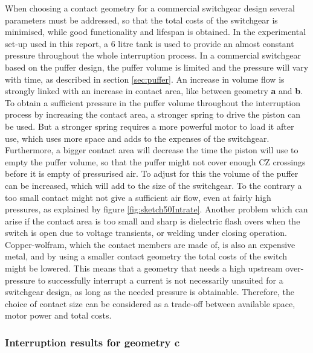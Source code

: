 \documentclass[10pt,b5paper,twoside]{article}
\begin{document}
When choosing a contact geometry for a commercial switchgear design several parameters must be addressed, so that the total costs of the switchgear is minimised, while good functionality and lifespan is obtained. In the experimental set-up used in this report, a 6 litre tank is used to provide an almost constant pressure throughout the whole interruption process. In a commercial switchgear based on the puffer design, the puffer volume is limited and the pressure will vary with time, as described in section \ref{sec:puffer}. An increase in volume flow is strongly linked with an increase in contact area, like between geometry \textbf{a} and \textbf{b}. To obtain a sufficient pressure in the puffer volume throughout the interruption process by increasing the contact area, a stronger spring to drive the piston can be used. But a stronger spring requires a more powerful motor to load it after use, which uses more space and adds to the expenses of the switchgear. Furthermore, a bigger contact area will decrease the time the piston will use to empty the puffer volume, so that the puffer might not cover enough CZ crossings before it is empty of pressurised air. To adjust for this the volume of the puffer can be increased, which will add to the size of the switchgear. To the contrary a too small contact might not give a sufficient air flow, even at fairly high pressures, as explained by figure \ref{fig:sketch50Intrate}. Another problem which can arise if the contact area is too small and sharp is dielectric flash overs when the switch is open due to voltage transients, or welding under closing operation. Copper-wolfram, which the contact members are made of, is also an expensive metal, and by using a smaller contact geometry the total costs of the switch might be lowered. This means that a geometry that needs a high upstream over-pressure to successfully interrupt a current is not necessarily unsuited for a switchgear design, as long as the needed pressure is obtainable. Therefore, the choice of contact size can be considered as a trade-off between available space, motor power and total costs.

\subsubsection{Interruption results for geometry \textbf{c}} \label{sec:intTestGeoC}
\end{document}
